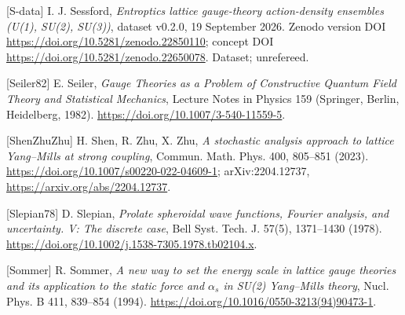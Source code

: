 \documentclass[10pt,letterpaper,twocolumn]{article}
\begin{document}
{[}S-data{]} I. J. Sessford, \emph{Entroptics lattice gauge-theory action-density ensembles (U(1), SU(2), SU(3))}, dataset v0.2.0, 19 September 2026. Zenodo version DOI \href{https://doi.org/10.5281/zenodo.22850110}{https:\allowbreak{}/\allowbreak{}/\allowbreak{}doi.\allowbreak{}org/\allowbreak{}10.\allowbreak{}5281/\allowbreak{}zenodo.\allowbreak{}22850110}; concept DOI \href{https://doi.org/10.5281/zenodo.22650078}{https:\allowbreak{}/\allowbreak{}/\allowbreak{}doi.\allowbreak{}org/\allowbreak{}10.\allowbreak{}5281/\allowbreak{}zenodo.\allowbreak{}22650078}. Dataset; unrefereed.

{[}Seiler82{]} E. Seiler, \emph{Gauge Theories as a Problem of Constructive Quantum Field Theory and Statistical Mechanics}, Lecture Notes in Physics 159 (Springer, Berlin, Heidelberg, 1982). \href{https://doi.org/10.1007/3-540-11559-5}{https:\allowbreak{}/\allowbreak{}/\allowbreak{}doi.\allowbreak{}org/\allowbreak{}10.\allowbreak{}1007/\allowbreak{}3-\allowbreak{}540-\allowbreak{}11559-\allowbreak{}5}.

{[}ShenZhuZhu{]} H. Shen, R. Zhu, X. Zhu, \emph{A stochastic analysis approach to lattice Yang--Mills at strong coupling}, Commun. Math. Phys. 400, 805--851 (2023). \href{https://doi.org/10.1007/s00220-022-04609-1}{https:\allowbreak{}/\allowbreak{}/\allowbreak{}doi.\allowbreak{}org/\allowbreak{}10.\allowbreak{}1007/\allowbreak{}s00220-\allowbreak{}022-\allowbreak{}04609-\allowbreak{}1}; arXiv:2204.12737, \href{https://arxiv.org/abs/2204.12737}{https:\allowbreak{}/\allowbreak{}/\allowbreak{}arxiv.\allowbreak{}org/\allowbreak{}abs/\allowbreak{}2204.\allowbreak{}12737}.

{[}Slepian78{]} D. Slepian, \emph{Prolate spheroidal wave functions, Fourier analysis, and uncertainty. V: The discrete case}, Bell Syst. Tech. J. 57(5), 1371--1430 (1978). \href{https://doi.org/10.1002/j.1538-7305.1978.tb02104.x}{https:\allowbreak{}/\allowbreak{}/\allowbreak{}doi.\allowbreak{}org/\allowbreak{}10.\allowbreak{}1002/\allowbreak{}j.\allowbreak{}1538-\allowbreak{}7305.\allowbreak{}1978.\allowbreak{}tb02104.\allowbreak{}x}.

{[}Sommer{]} R. Sommer, \emph{A new way to set the energy scale in lattice gauge theories and its application to the static force and \(\alpha_s\) in SU(2) Yang--Mills theory}, Nucl. Phys. B 411, 839--854 (1994). \href{https://doi.org/10.1016/0550-3213(94)90473-1}{https:\allowbreak{}/\allowbreak{}/\allowbreak{}doi.\allowbreak{}org/\allowbreak{}10.\allowbreak{}1016/\allowbreak{}0550-\allowbreak{}3213(\allowbreak{}94)\allowbreak{}90473-\allowbreak{}1}.
\end{document}
